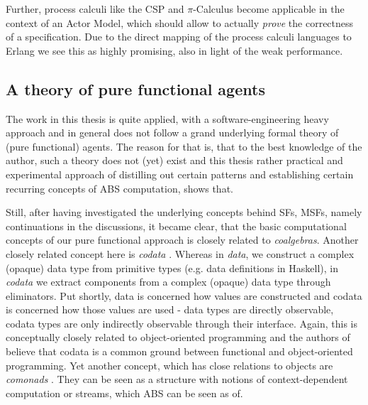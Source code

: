 Further, process calculi like the CSP \cite{hoare_communicating_1985} and $\pi$-Calculus \cite{milner_communicating_1999} become applicable in the context of an Actor Model, which should allow to actually \textit{prove} the correctness of a specification. Due to the direct mapping of the process calculi languages to Erlang we see this as highly promising, also in light of the weak performance.


\subsection{A theory of pure functional agents}
The work in this thesis is quite applied, with a software-engineering heavy approach and in general does not follow a grand underlying formal theory of (pure functional) agents. The reason for that is, that to the best knowledge of the author, such a theory does not (yet) exist and this thesis rather practical and experimental approach of distilling out certain patterns and establishing certain recurring concepts of ABS computation, shows that.

Still, after having investigated the underlying concepts behind SFs, MSFs, namely continuations in the discussions, it became clear, that the basic computational concepts of our pure functional approach is closely related to \textit{coalgebras}. %
Another closely related concept here is \textit{codata} \cite{downen_codata_2019}. Whereas in \textit{data}, we construct a complex (opaque) data type from primitive types (e.g. data definitions in Haskell), in \textit{codata} we extract components from a complex (opaque) data type through eliminators. Put shortly, data is concerned how values are constructed and codata is concerned how those values are used \cite{downen_codata_2019} - data types are directly observable, codata types are only indirectly observable through their interface. Again, this is conceptually closely related to object-oriented programming and the authors of \cite{downen_codata_2019} believe that codata is a common ground between functional and object-oriented programming. Yet another concept, which has close relations to objects are \textit{comonads} \cite{uustalu_essence_2006}. They can be seen as a structure with notions of  context-dependent computation or streams, which ABS can be seen as of.

